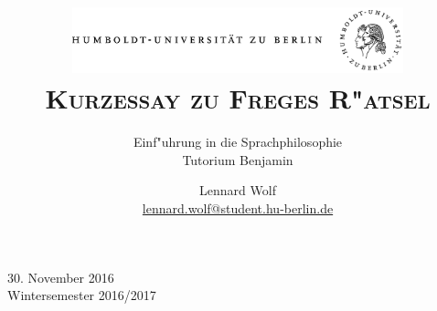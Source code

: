 \documentclass[a4paper, emulatestandardclasses, 12pt]{scrartcl}
\date{\vspace{-3ex}}
\begin{document}
\title{\vspace{5ex}
	\includegraphics*[width=0.72\textwidth]{images/hu_logo.png}\\
	\vspace{30pt}
	\scshape\LARGE{Kurzessay zu Freges R"atsel}}
	
	\subtitle{\vspace{20pt}Einf"uhrung in die Sprachphilosophie\\
          \vspace{6pt}
          Tutorium Benjamin\\}


\author{\vspace{-4pt}Lennard Wolf\\
        \small{\href{mailto:lennard.wolf@student.hu-berlin.de}{lennard.wolf@student.hu-berlin.de}}}      

\maketitle

\vspace{\fill}

\begin{minipage}[b]{\textwidth}
    \centering
    \onehalfspacing
    \large   
    30. November 2016\\
    Wintersemester 2016/2017

    \vspace{-20mm} 
\end{minipage}%
\thispagestyle{empty}
\newpage
\clearpage
\setcounter{page}{1}
\end{document}
